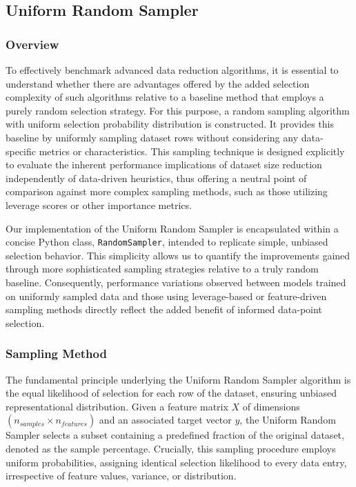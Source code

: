 \documentclass{article}
\theoremstyle{plain}
\theoremstyle{definition}
\theoremstyle{remark}
\begin{document}
\subsection{Uniform Random Sampler}

\subsubsection{Overview}

To effectively benchmark advanced data reduction algorithms, it is essential to understand whether there are advantages offered by the added selection complexity of such algorithms relative to a baseline method that employs a purely random selection strategy. For this purpose, a random sampling algorithm with uniform selection probability distribution is constructed. It provides this baseline by uniformly sampling dataset rows without considering any data-specific metrics or characteristics. This sampling technique is designed explicitly to evaluate the inherent performance implications of dataset size reduction independently of data-driven heuristics, thus offering a neutral point of comparison against more complex sampling methods, such as those utilizing leverage scores or other importance metrics.

Our implementation of the Uniform Random Sampler is encapsulated within a concise Python class, \texttt{RandomSampler}, intended to replicate simple, unbiased selection behavior. This simplicity allows us to quantify the improvements gained through more sophisticated sampling strategies relative to a truly random baseline. Consequently, performance variations observed between models trained on uniformly sampled data and those using leverage-based or feature-driven sampling methods directly reflect the added benefit of informed data-point selection.

\subsubsection{Sampling Method}

The fundamental principle underlying the Uniform Random Sampler algorithm is the equal likelihood of selection for each row of the dataset, ensuring unbiased representational distribution. Given a feature matrix $X$ of dimensions $(n_{samples} \times n_{features})$ and an associated target vector $y$, the Uniform Random Sampler selects a subset containing a predefined fraction of the original dataset, denoted as the sample percentage. Crucially, this sampling procedure employs uniform probabilities, assigning identical selection likelihood to every data entry, irrespective of feature values, variance, or distribution.
\end{document}
